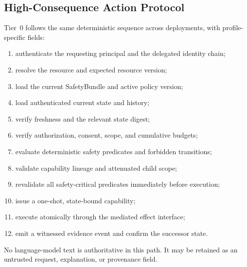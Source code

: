 \documentclass[11pt]{article}
\newcommand{\SafetyBundle}{\textsf{SafetyBundle}}
\begin{document}
\subsection{High-Consequence Action Protocol}
Tier~0 follows the same deterministic sequence across deployments, with profile-specific fields:
\begin{enumerate}
\item authenticate the requesting principal and the delegated identity chain;
\item resolve the resource and expected resource version;
\item load the current \SafetyBundle{} and active policy version;
\item load authenticated current state and history;
\item verify freshness and the relevant state digest;
\item verify authorization, consent, scope, and cumulative budgets;
\item evaluate deterministic safety predicates and forbidden transitions;
\item validate capability lineage and attenuated child scope;
\item revalidate all safety-critical predicates immediately before execution;
\item issue a one-shot, state-bound capability;
\item execute atomically through the mediated effect interface;
\item emit a witnessed evidence event and confirm the successor state.
\end{enumerate}
No language-model text is authoritative in this path. It may be retained as an untrusted request, explanation, or provenance field.
\end{document}
